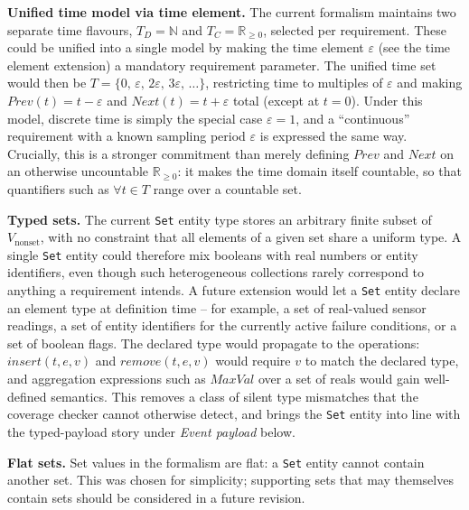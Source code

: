 \textbf{Unified time model via time element.} The current formalism maintains two separate time flavours, $T_D = \mathbb{N}$ and $T_C = \mathbb{R}_{\geq 0}$, selected per requirement. These could be unified into a single model by making the time element $\varepsilon$ (see the time element extension) a mandatory requirement parameter. The unified time set would then be $T = \{0,\, \varepsilon,\, 2\varepsilon,\, 3\varepsilon,\, \ldots\}$, restricting time to multiples of $\varepsilon$ and making $\mathit{Prev}(t) = t - \varepsilon$ and $\mathit{Next}(t) = t + \varepsilon$ total (except at $t = 0$). Under this model, discrete time is simply the special case $\varepsilon = 1$, and a ``continuous'' requirement with a known sampling period $\varepsilon$ is expressed the same way. Crucially, this is a stronger commitment than merely defining $\mathit{Prev}$ and $\mathit{Next}$ on an otherwise uncountable $\mathbb{R}_{\geq 0}$: it makes the time domain itself countable, so that quantifiers such as $\forall t \in T$ range over a countable set.

\textbf{Typed sets.} The current \texttt{Set} entity type stores an arbitrary finite subset of $V_{\mathrm{nonset}}$, with no constraint that all elements of a given set share a uniform type. A single \texttt{Set} entity could therefore mix booleans with real numbers or entity identifiers, even though such heterogeneous collections rarely correspond to anything a requirement intends. A future extension would let a \texttt{Set} entity declare an element type at definition time -- for example, a set of real-valued sensor readings, a set of entity identifiers for the currently active failure conditions, or a set of boolean flags. The declared type would propagate to the operations: $\mathit{insert}(t, e, v)$ and $\mathit{remove}(t, e, v)$ would require $v$ to match the declared type, and aggregation expressions such as $\mathit{MaxVal}$ over a set of reals would gain well-defined semantics. This removes a class of silent type mismatches that the coverage checker cannot otherwise detect, and brings the \texttt{Set} entity into line with the typed-payload story under \emph{Event payload} below.

\textbf{Flat sets.} Set values in the formalism are flat: a \texttt{Set} entity cannot contain another set. This was chosen for simplicity; supporting sets that may themselves contain sets should be considered in a future revision.

